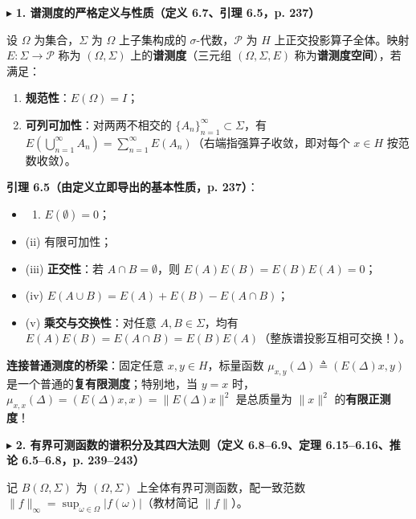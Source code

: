 \documentclass[11pt,a4paper]{article}
\providecommand{\tightlist}{\setlength{\itemsep}{2pt}\setlength{\parskip}{0pt}}
\newcommand{\SubSubHeading}[1]{%
  \Needspace{6.5\baselineskip}\vspace{5.5pt}\noindent
  \textcolor{AccentMain}{\scriptsize$\blacktriangleright$}\hspace{4pt}%
  {\small\bfseries\color{AccentMain}#1}\par\nopagebreak[4]\vspace{2.5pt}%
}
\renewenvironment{quote}{%
  \begin{tcolorbox}[
    enhanced,
    breakable,
    colback=AccentSoft!48!white,
    colframe=AccentMain,
    boxrule=0pt,
    leftrule=2.8pt,
    arc=2.5pt,
    left=9pt, right=8pt, top=6pt, bottom=6pt,
    before skip=5.5pt, after skip=5.5pt
  ]\small
}{%
  \end{tcolorbox}%
}
\begin{document}
\SubSubHeading{1. 谱测度的严格定义与性质（定义 6.7、引理 6.5，p. 237）}

设 \(\Omega\) 为集合，\(\Sigma\) 为 \(\Omega\) 上子集构成的 \(\sigma\)-代数，\(\mathcal{P}\) 为 \(H\) 上正交投影算子全体。映射 \(E : \Sigma \to \mathcal{P}\) 称为 \((\Omega, \Sigma)\) 上的\textbf{谱测度}（三元组 \((\Omega, \Sigma, E)\) 称为\textbf{谱测度空间}），若满足：

\begin{enumerate}
\def\labelenumi{\arabic{enumi}.}
\tightlist
\item
  \textbf{规范性}：\(E(\Omega) = I\)；
\item
  \textbf{可列可加性}：对两两不相交的 \(\{A_n\}_{n=1}^\infty \subset \Sigma\)，有 \(E\left(\bigcup_{n=1}^\infty A_n\right) = \sum_{n=1}^\infty E(A_n)\)（右端指强算子收敛，即对每个 \(x \in H\) 按范数收敛）。
\end{enumerate}

\textbf{引理 6.5（由定义立即导出的基本性质，p. 237）}：

\begin{itemize}
\tightlist
\item
  \begin{enumerate}
  \def\labelenumi{(\roman{enumi})}
  \tightlist
  \item
    \(E(\emptyset) = 0\)；
  \end{enumerate}
\item
  (ii) 有限可加性；
\item
  (iii) \textbf{正交性}：若 \(A \cap B = \emptyset\)，则 \(E(A)E(B) = E(B)E(A) = 0\)；
\item
  (iv) \(E(A \cup B) = E(A) + E(B) - E(A \cap B)\)；
\item
  (v) \textbf{乘交与交换性}：对任意 \(A, B \in \Sigma\)，均有 \(E(A)E(B) = E(A \cap B) = E(B)E(A)\)（整族谱投影互相可交换！）。
\end{itemize}

\begin{quote}
\textbf{连接普通测度的桥梁}：固定任意 \(x, y \in H\)，标量函数 \(\mu_{x,y}(\Delta) \triangleq (E(\Delta)x, y)\) 是一个普通的\textbf{复有限测度}；特别地，当 \(y = x\) 时，\(\mu_{x,x}(\Delta) = (E(\Delta)x, x) = \|E(\Delta)x\|^2\) 是总质量为 \(\|x\|^2\) 的\textbf{有限正测度}！
\end{quote}

\SubSubHeading{2. 有界可测函数的谱积分及其四大法则（定义 6.8--6.9、定理 6.15--6.16、推论 6.5--6.8，p. 239--243）}

记 \(B(\Omega, \Sigma)\) 为 \((\Omega, \Sigma)\) 上全体有界可测函数，配一致范数 \(\|f\|_\infty = \sup_{\omega \in \Omega}|f(\omega)|\)（教材简记 \(\|f\|\)）。
\end{document}
